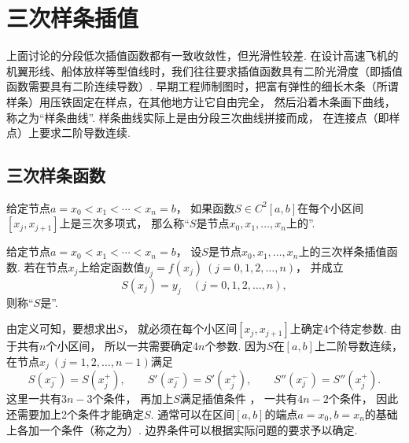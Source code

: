 \section{三次样条插值}
上面讨论的分段低次插值函数都有一致收敛性，但光滑性较差.
在设计高速飞机的机翼形线、船体放样等型值线时，我们往往要求插值函数具有二阶光滑度（即插值函数需要具有二阶连续导数）.
早期工程师制图时，把富有弹性的细长木条（所谓样条）用压铁固定在样点，在其他地方让它自由完全，
然后沿着木条画下曲线，称之为“样条曲线”.
样条曲线实际上是由分段三次曲线拼接而成，
在连接点（即样点）上要求二阶导数连续.

\subsection{三次样条函数}
\begin{definition}
给定节点\(a = x_0 < x_1 < \dotsb < x_n = b\)，
如果函数\(S \in C^2[a,b]\)在每个小区间\([x_j,x_{j+1}]\)上是三次多项式，
那么称“\(S\)是节点\(x_0,x_1,\dotsc,x_n\)上的”.
\end{definition}

\begin{definition}
给定节点\(a = x_0 < x_1 < \dotsb < x_n = b\)，
设\(S\)是节点\(x_0,x_1,\dotsc,x_n\)上的三次样条插值函数.
若在节点\(x_j\)上给定函数值\(y_j = f(x_j)\ (j=0,1,2,\dotsc,n)\)，
并成立\begin{equation}\label{equation:三次样条插值.三次样条插值条件}
	S(x_j) = y_j
	\quad(j=0,1,2,\dotsc,n),
\end{equation}
则称“\(S\)是”.
\end{definition}

由定义可知，要想求出\(S\)，
就必须在每个小区间\([x_j,x_{j+1}]\)上确定4个待定参数.
由于共有\(n\)个小区间，
所以一共需要确定\(4n\)个参数.
因为\(S\)在\([a,b]\)上二阶导数连续，
在节点\(x_j\ (j=1,2,\dotsc,n-1)\)满足\begin{equation*}
	S(x_j^-) = S(x_j^+),
	\qquad
	S'(x_j^-) = S'(x_j^+),
	\qquad
	S''(x_j^-) = S''(x_j^+).
\end{equation*}
这里一共有\(3n-3\)个条件，
再加上\(S\)满足插值条件 ，
一共有\(4n-2\)个条件，
因此还需要加上2个条件才能确定\(S\).
通常可以在区间\([a,b]\)的端点\(a = x_0, b = x_n\)的基础上各加一个条件（称之为）.
边界条件可以根据实际问题的要求予以确定.


